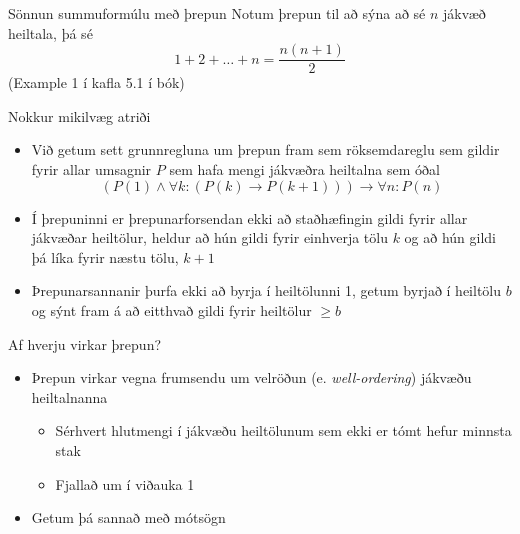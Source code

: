 \documentclass[handout]{beamer}
\begin{document}
\begin{frame}{Sönnun summuformúlu með þrepun}
    Notum þrepun til að sýna að sé $n$ jákvæð heiltala, þá sé
    \[
        1 + 2 + \ldots + n = \frac{n(n+1)}{2}
    \]
    \pause
    (Example 1 í kafla 5.1 í bók)
\end{frame}

\begin{frame}{Nokkur mikilvæg atriði}
    \begin{itemize}
        \item Við getum sett grunnregluna um þrepun fram sem röksemdareglu sem gildir fyrir allar umsagnir $P$ sem hafa mengi jákvæðra heiltalna sem óðal
        \[
            \left(P(1) \land \forall k: (P(k) \to P(k+1))\right) \to \forall n: P(n)
        \] \pause
        \item Í þrepuninni er þrepunarforsendan ekki að staðhæfingin gildi fyrir allar jákvæðar heiltölur, heldur að hún gildi fyrir einhverja tölu $k$ og að hún gildi þá líka fyrir næstu tölu, $k+1$ \pause
        \item Þrepunarsannanir þurfa ekki að byrja í heiltölunni 1, getum byrjað í heiltölu $b$ og sýnt fram á að eitthvað gildi fyrir heiltölur $\geq b$
    \end{itemize}
\end{frame}

\begin{frame}{Af hverju virkar þrepun?}
    \begin{itemize}
        \item Þrepun virkar vegna frumsendu um velröðun (e. \emph{well-ordering}) jákvæðu heiltalnanna
        \begin{itemize}
            \item Sérhvert hlutmengi í jákvæðu heiltölunum sem ekki er tómt hefur minnsta stak
            \item Fjallað um í viðauka 1
        \end{itemize}
        \item Getum þá sannað með mótsögn
    \end{itemize}
\end{frame}
\end{document}
